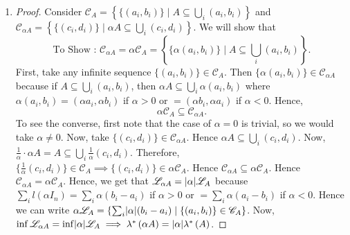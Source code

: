 \documentclass{article}
\theoremstyle{definition}
\theoremstyle{remark}
\theoremstyle{definition}
\theoremstyle{definition}
\theoremstyle{definition}
\DeclarePairedDelimiter\abs{\lvert}{\rvert}
\newcommand{\union}{\cup}
\newcommand{\bunion}{\bigcup}
\newcommand{\where}{\;\vert\;}
\newcommand{\lom}[1]{\lambda^*\left (#1\right )}
\newcommand{\set}[1]{\mathscr{#1}}
\begin{document}
\begin{enumerate}
{\begin{proof}
\begin{equation*}
\begin{split}
				\lom{(a,b]} =b-a &\le \lom{(a,b) \union \bunion_{n} (b,b+\epsilon/2^n]} \\
				&\le \lom{(a,b)}  \sum_{n} b - (b+\epsilon/2^n)\\
				&= \lom{(a,b)} + \sum_n b-b -\epsilon/2^n\\
				&= \lom{(a,b)} + \sum_n \epsilon/2^n\\
				&= \lom{(a,b)}.
			\end{split}
		\end{equation*}
	Hence, $ l((a,b)) = \lom{(a,b)} = b-a $. Hence, one can take interval $ \{(a_n,b_n)\} $ as the sequence of intervals in the definition of Lebesgue Outer Measure as well, instead of $ \{(a_n,b_n]\} $.
\end{proof}}
\item {\begin{proof}
		Consider $ \set{C}_A = \left \{\{(a_i,b_i)\}\where A \subseteq \bunion_i(a_i,b_i)\right \} $ and $ \set{C}_{\alpha A} = \left \{ \{(c_i,d_i)\}\where \alpha A \subseteq  \bunion_i (c_i,d_i) \right \} $. We will show that 
		\[\text{To Show : }\set{C}_{\alpha A} = \alpha \set{C}_{A} = \left \{\{\alpha(a_i,b_i)\} \where A \subseteq \bunion_i(a_i,b_i)\right \}.\]
		First, take any infinite sequence $ \{(a_i,b_i)\}\in \set{C}_A $. Then $ \{\alpha(a_i,b_i)\} \in \set{C}_{\alpha A} $ because if $ A \subseteq \bunion_i (a_i,b_i) $, then $ \alpha A \subseteq \bunion_i \alpha(a_i,b_i) $ where $ \alpha(a_i,b_i) = (\alpha a_i,\alpha b_i) $ if $ \alpha > 0 $ or $ = (\alpha b_i, \alpha a_i) $ if $ \alpha <0 $. Hence, 
		\[ \alpha \set{C}_A \subseteq \set{C}_{\alpha A}. \]
		To see the converse, first note that the case of $ \alpha = 0 $ is trivial, so we would take $ \alpha \neq 0 $. Now, take $ \{(c_i,d_i)\}\in \set{C}_{\alpha A} $. Hence $ \alpha A \subseteq \bunion_i (c_i,d_i)  $. Now, $ \frac{1}{\alpha} \cdot \alpha A = A \subseteq \bunion_i \frac{1}{\alpha}\left (c_i,d_i\right ) $. Therefore, $ \{\frac{1}{\alpha}(c_i,d_i)\} \in \set{C}_A \implies \{(c_i,d_i)\} \in \alpha \set{C}_A$. Hence $ \set{C}_{\alpha A} \subseteq \alpha \set{C}_A $. Hence $ \set{C}_{\alpha A} = \alpha\set{C}_A $. Hence, we get that $ \set{L}_{\alpha A} = \abs{\alpha}\set{L}_A $ because $ \sum_i l(\alpha I_n) = \sum_{i} \alpha(b_i-a_i)$ if $ \alpha > 0$ or $ = \sum_i \alpha(a_i-b_i) $ if $ \alpha<0 $. Hence we can write $ \alpha\set{L}_A = \{ \sum_i \abs{\alpha}(b_i - a_i)\where \{(a_i,b_i)\} \in \set{C}_A  \} $. Now, $ \inf \set{L}_{\alpha A} = \inf \abs{\alpha} \set{L}_A \implies \lom{\alpha A} = \abs{\alpha} \lom{A}$.
\end{proof}}

\end{enumerate}
\end{document}
